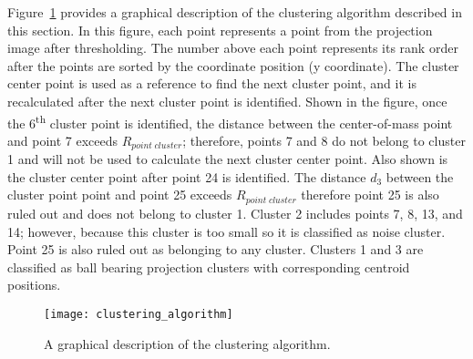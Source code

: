 Figure~\ref{fig:clustering_algorithm} provides a graphical description of the clustering algorithm described in this section.  In this figure, each point represents a point from the projection image after thresholding.  The number above each point represents its rank order after the points are sorted by the coordinate position (y coordinate).  The cluster center point is used as a reference to find the next cluster point, and it is recalculated after the next cluster point is identified.  Shown in the figure, once the 6\textsuperscript{th} cluster point is identified, the distance between the center-of-mass point and point 7 exceeds $R_{point \; cluster}$; therefore, points 7 and 8 do not belong to cluster 1 and will not be used to calculate the next cluster center point.  Also shown is the cluster center point after point 24 is identified. The distance $d_3$ between the cluster point point and point 25 exceeds $R_{point \; cluster}$ therefore point 25 is also ruled out and does not belong to cluster 1.  Cluster 2 includes points 7, 8, 13, and 14; however, because this cluster is too small so it is classified as noise cluster.  Point 25 is also ruled out as belonging to any cluster.  Clusters 1 and 3 are classified as ball bearing projection clusters with corresponding centroid positions.
%
\begin{figure}[ht]
\centering
\texttt{[image: clustering\_algorithm]}
\caption{A graphical description of the clustering algorithm.  }
\label{fig:clustering_algorithm}
\end{figure}



